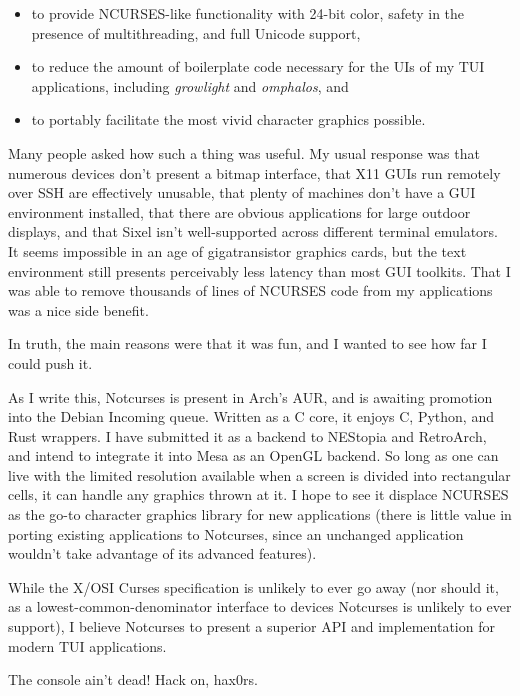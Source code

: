 \documentclass[letterpaper,10pt]{article}
\newenvironment{denseitemize}{
  \begin{itemize}
      \setlength{\itemsep}{0pt}
}{
  \end{itemize}
}
\newcommand\CC{C\nolinebreak\hspace{-.05em}\raisebox{.4ex}{\relsize{-3}{\textbf{+}}}\nolinebreak\hspace{-.10em}\raisebox{.4ex}{\relsize{-3}{\textbf{+}}}\hspace{.2em}}
\begin{document}
\begin{denseitemize}
\item to provide NCURSES-like functionality with 24-bit color, safety in the
    presence of multithreading, and full Unicode support,
\item to reduce the amount of boilerplate code necessary for the UIs of my
    TUI applications, including \textit{growlight} and \textit{omphalos}, and
\item to portably facilitate the most vivid character graphics possible.
\end{denseitemize}

Many people asked how such a thing was useful. My usual response was that
numerous devices don't present a bitmap interface, that X11 GUIs run remotely
over SSH are effectively unusable, that plenty of machines don't have a GUI
environment installed, that there are obvious applications for large outdoor
displays, and that Sixel isn't well-supported across different
terminal emulators. It seems impossible in an age of gigatransistor graphics
cards, but the text environment still presents perceivably less latency
than most GUI toolkits. That I was able to remove thousands of lines
of NCURSES code from my applications was a nice side benefit.

In truth, the main reasons were that it was fun, and I wanted to see how far
I could push it.

As I write this, Notcurses is present in Arch's AUR, and is awaiting promotion
into the Debian Incoming queue. Written as a C core, it enjoys \CC, Python, and
Rust wrappers. I have submitted it as a backend to NEStopia and RetroArch, and
intend to integrate it into Mesa as an OpenGL backend. So long as one can live
with the limited resolution available when a screen is divided into rectangular
cells, it can handle any graphics thrown at it. I hope to see it displace
NCURSES as the go-to character graphics library for new applications (there is
little value in porting existing applications to Notcurses, since an unchanged
application wouldn't take advantage of its advanced features).

While the X/OSI Curses specification is unlikely to ever go away (nor should
it, as a lowest-common-denominator interface to devices Notcurses is unlikely
to ever support), I believe Notcurses to present a superior API and
implementation for modern TUI applications.

The console ain't dead! Hack on, hax0rs.

\vspace{.5in}
\end{document}
